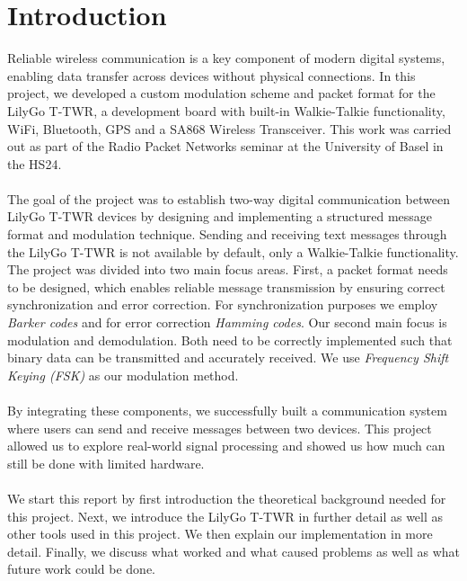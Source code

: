 \chapter{Introduction}
Reliable wireless communication is a key component of modern digital systems, enabling data transfer across devices without physical connections. In this project, we developed a custom modulation scheme and packet format for the LilyGo T-TWR, a development board with built-in Walkie-Talkie functionality, WiFi, Bluetooth, GPS and a SA868 Wireless Transceiver. This work was carried out as part of the Radio Packet Networks seminar at the University of Basel in the HS24.
\\\\
The goal of the project was to establish two-way digital communication between LilyGo T-TWR devices by designing and implementing a structured message format and modulation technique. Sending and receiving text messages through the LilyGo T-TWR is not available by default, only a Walkie-Talkie functionality. The project was divided into two main focus areas. First, a packet format needs to be designed, which enables reliable message transmission by ensuring correct synchronization and error correction. For synchronization purposes we employ \textit{Barker codes} and for error correction \textit{Hamming codes}. Our second main focus is modulation and demodulation. Both need to be correctly implemented such that binary data can be transmitted and accurately received. We use \textit{Frequency Shift Keying (FSK)} as our modulation method. %
\\ \\
By integrating these components, we successfully built a communication system where users can send and receive messages between two devices. This project allowed us to explore real-world signal processing and showed us how much can still be done with limited hardware.
\\ \\
We start this report by first introduction the theoretical background needed for this project. Next, we introduce the LilyGo T-TWR in further detail as well as other tools used in this project. We then explain our implementation in more detail. Finally, we discuss what worked and what caused problems as well as what future work could be done.